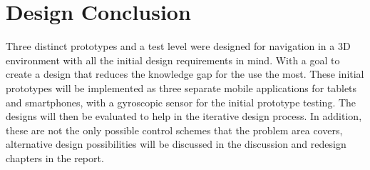 \section{Design Conclusion}
Three distinct prototypes and a test level were designed for navigation in a 3D environment with all the initial design requirements in mind. With a goal to create a design that reduces the knowledge gap for the use the most. These initial prototypes will be implemented as three separate mobile applications for tablets and smartphones, with a gyroscopic sensor for the initial prototype testing. The designs will then be evaluated to help in the iterative design process.
In addition, these are not the only possible control schemes that the problem area covers, alternative design possibilities will be discussed in the discussion and redesign chapters in the report. 